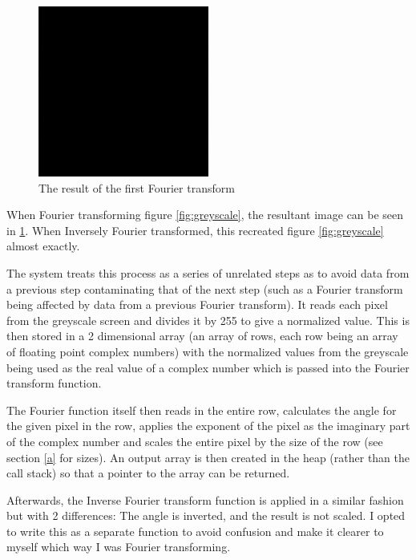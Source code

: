 \documentclass{article}
\begin{document}
\begin{figure}[h]
    \centering
    \caption{The result of the first Fourier transform}
    \label{fig:fourier}
    \includegraphics[width=0.5\textwidth]{fourier_image.png}
\end{figure}

When Fourier transforming figure \ref{fig:greyscale}, the resultant image can be seen in \ref{fig:fourier}. When Inversely Fourier transformed, this recreated figure \ref{fig:greyscale} almost exactly.

The system treats this process as a series of unrelated steps as to avoid data from a previous step contaminating that of the next step (such as a Fourier transform being affected by data from a previous Fourier transform). It reads each pixel from the greyscale screen and divides it by 255 to give a normalized value. This is then stored in a 2 dimensional array (an array of rows, each row being an array of floating point complex numbers) with the normalized values from the greyscale being used as the real value of a complex number which is passed into the Fourier transform function.

The Fourier function itself then reads in the entire row, calculates the angle for the given pixel in the row, applies the exponent of the pixel as the imaginary part of the complex number and scales the entire pixel by the size of the row (see section \ref{a} for sizes). An output array is then created in the heap (rather than the call stack) so that a pointer to the array can be returned.

Afterwards, the Inverse Fourier transform function is applied in a similar fashion but with 2 differences: The angle is inverted, and the result is not scaled. I opted to write this as a separate function to avoid confusion and make it clearer to myself which way I was Fourier transforming.
\end{document}
